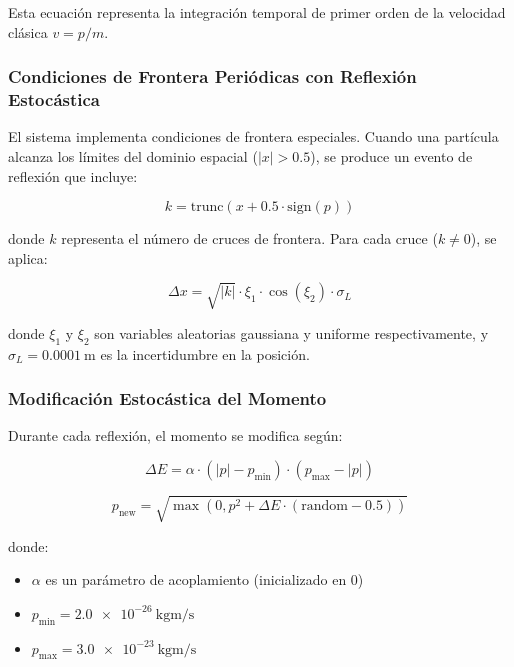\documentclass[12pt,a4paper]{article}
\begin{document}
Esta ecuación representa la integración temporal de primer orden de la velocidad clásica $v = p/m$.

\subsubsection{Condiciones de Frontera Periódicas con Reflexión Estocástica}

El sistema implementa condiciones de frontera especiales. Cuando una partícula alcanza los límites del dominio espacial ($|x| > 0.5$), se produce un evento de reflexión que incluye:

\begin{equation}
k = \text{trunc}(x + 0.5 \cdot \text{sign}(p))
\end{equation}

donde $k$ representa el número de cruces de frontera. Para cada cruce ($k \neq 0$), se aplica:

\begin{equation}
\Delta x = \sqrt{|k|} \cdot \xi_1 \cdot \cos(\xi_2) \cdot \sigma_L
\end{equation}

donde $\xi_1$ y $\xi_2$ son variables aleatorias gaussiana y uniforme respectivamente, y $\sigma_L = \SI{0.0001}{\meter}$ es la incertidumbre en la posición.

\subsubsection{Modificación Estocástica del Momento}

Durante cada reflexión, el momento se modifica según:

\begin{equation}
\Delta E = \alpha \cdot (|p| - p_{\min}) \cdot (p_{\max} - |p|)
\end{equation}

\begin{equation}
p_{\text{new}} = \sqrt{\max(0, p^2 + \Delta E \cdot (\text{random} - 0.5))}
\end{equation}

donde:
\begin{itemize}
    \item $\alpha$ es un parámetro de acoplamiento (inicializado en 0)
    \item $p_{\min} = \SI{2.0e-26}{\kilogram\meter\per\second}$
    \item $p_{\max} = \SI{3.0e-23}{\kilogram\meter\per\second}$
\end{itemize}
\end{document}
